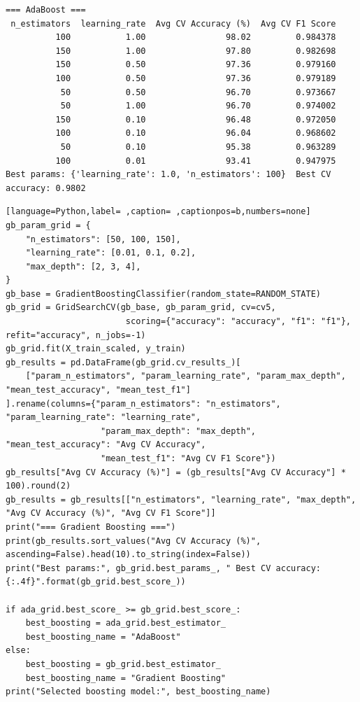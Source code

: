 \documentclass[12pt,a4paper]{article}
\begin{document}
\begin{verbatim}
=== AdaBoost ===
 n_estimators  learning_rate  Avg CV Accuracy (%)  Avg CV F1 Score
          100           1.00                98.02         0.984378
          150           1.00                97.80         0.982698
          150           0.50                97.36         0.979160
          100           0.50                97.36         0.979189
           50           0.50                96.70         0.973667
           50           1.00                96.70         0.974002
          150           0.10                96.48         0.972050
          100           0.10                96.04         0.968602
           50           0.10                95.38         0.963289
          100           0.01                93.41         0.947975
Best params: {'learning_rate': 1.0, 'n_estimators': 100}  Best CV accuracy: 0.9802
\end{verbatim}

\begin{lstlisting}[language=Python,label= ,caption= ,captionpos=b,numbers=none]
gb_param_grid = {
    "n_estimators": [50, 100, 150],
    "learning_rate": [0.01, 0.1, 0.2],
    "max_depth": [2, 3, 4],
}
gb_base = GradientBoostingClassifier(random_state=RANDOM_STATE)
gb_grid = GridSearchCV(gb_base, gb_param_grid, cv=cv5,
                        scoring={"accuracy": "accuracy", "f1": "f1"}, refit="accuracy", n_jobs=-1)
gb_grid.fit(X_train_scaled, y_train)
gb_results = pd.DataFrame(gb_grid.cv_results_)[
    ["param_n_estimators", "param_learning_rate", "param_max_depth", "mean_test_accuracy", "mean_test_f1"]
].rename(columns={"param_n_estimators": "n_estimators", "param_learning_rate": "learning_rate",
                   "param_max_depth": "max_depth", "mean_test_accuracy": "Avg CV Accuracy",
                   "mean_test_f1": "Avg CV F1 Score"})
gb_results["Avg CV Accuracy (%)"] = (gb_results["Avg CV Accuracy"] * 100).round(2)
gb_results = gb_results[["n_estimators", "learning_rate", "max_depth", "Avg CV Accuracy (%)", "Avg CV F1 Score"]]
print("=== Gradient Boosting ===")
print(gb_results.sort_values("Avg CV Accuracy (%)", ascending=False).head(10).to_string(index=False))
print("Best params:", gb_grid.best_params_, " Best CV accuracy: {:.4f}".format(gb_grid.best_score_))

if ada_grid.best_score_ >= gb_grid.best_score_:
    best_boosting = ada_grid.best_estimator_
    best_boosting_name = "AdaBoost"
else:
    best_boosting = gb_grid.best_estimator_
    best_boosting_name = "Gradient Boosting"
print("Selected boosting model:", best_boosting_name)
\end{lstlisting}
\end{document}
